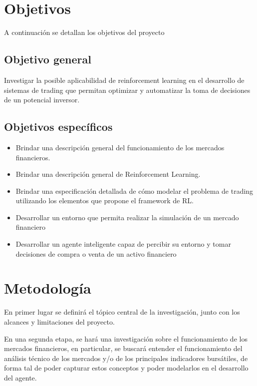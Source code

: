 \clearpage

\section{Objetivos}
A continuación se detallan los objetivos del proyecto

\subsection{Objetivo general}
Investigar la posible aplicabilidad de reinforcement learning en el desarrollo de sistemas de trading que permitan optimizar y automatizar la toma de decisiones de un potencial inversor.

\subsection{Objetivos específicos}

\begin{itemize} %
	
	\item Brindar una descripción general del funcionamiento de los mercados financieros.
	\item Brindar una descripción general de Reinforcement Learning.
	\item Brindar una especificación detallada de cómo modelar el problema de trading utilizando los elementos que propone el framework de RL.
	\item Desarrollar un entorno que permita realizar la simulación de un mercado financiero 
	\item Desarrollar un agente inteligente capaz de percibir su entorno y tomar decisiones de compra o venta de un activo financiero
\end{itemize}

\section{Metodología}
En primer lugar se definirá el tópico central de la investigación, junto con los alcances y limitaciones del proyecto.

En una segunda etapa, se hará una investigación sobre el funcionamiento de los mercados financieros, en particular, se buscará entender el funcionamiento del análisis técnico de los mercados  y/o de los principales indicadores bursátiles, de forma tal de poder capturar estos conceptos y poder modelarlos en el desarrollo del agente.  

